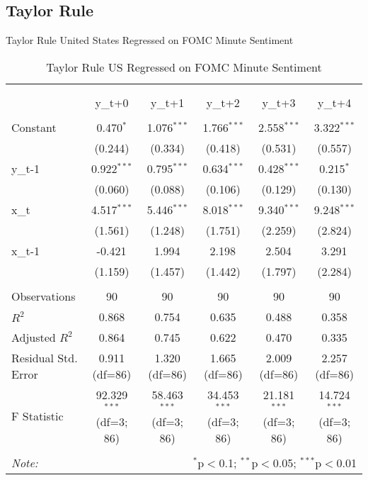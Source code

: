 \documentclass[12pt, letterpaper]{article}
\begin{document}
\subsection{Taylor Rule}

Taylor Rule United States Regressed on FOMC Minute Sentiment

\begin{table}[H] \centering
  \caption{Taylor Rule US Regressed on FOMC Minute Sentiment}
\begin{tabular}{@{\extracolsep{5pt}}lccccc}
\\[-1.8ex]\hline
\hline \\[-1.8ex]
\\[-1.8ex] & \multicolumn{1}{c}{y_{t+0}} & \multicolumn{1}{c}{y_{t+1}} & \multicolumn{1}{c}{y_{t+2}} & \multicolumn{1}{c}{y_{t+3}} & \multicolumn{1}{c}{y_{t+4}}  \\
\hline \\[-1.8ex]
 Constant & 0.470$^{*}$ & 1.076$^{***}$ & 1.766$^{***}$ & 2.558$^{***}$ & 3.322$^{***}$ \\
& (0.244) & (0.334) & (0.418) & (0.531) & (0.557) \\
 y_{t-1} & 0.922$^{***}$ & 0.795$^{***}$ & 0.634$^{***}$ & 0.428$^{***}$ & 0.215$^{*}$ \\
& (0.060) & (0.088) & (0.106) & (0.129) & (0.130) \\
 x_{t} & 4.517$^{***}$ & 5.446$^{***}$ & 8.018$^{***}$ & 9.340$^{***}$ & 9.248$^{***}$ \\
& (1.561) & (1.248) & (1.751) & (2.259) & (2.824) \\
 x_{t-1} & -0.421$^{}$ & 1.994$^{}$ & 2.198$^{}$ & 2.504$^{}$ & 3.291$^{}$ \\
& (1.159) & (1.457) & (1.442) & (1.797) & (2.284) \\
\hline \\[-1.8ex]
 Observations & 90 & 90 & 90 & 90 & 90 \\
 $R^2$ & 0.868 & 0.754 & 0.635 & 0.488 & 0.358 \\
 Adjusted $R^2$ & 0.864 & 0.745 & 0.622 & 0.470 & 0.335 \\
 Residual Std. Error & 0.911 (df=86) & 1.320 (df=86) & 1.665 (df=86) & 2.009 (df=86) & 2.257 (df=86) \\
 F Statistic & 92.329$^{***}$ (df=3; 86) & 58.463$^{***}$ (df=3; 86) & 34.453$^{***}$ (df=3; 86) & 21.181$^{***}$ (df=3; 86) & 14.724$^{***}$ (df=3; 86) \\
\hline
\hline \\[-1.8ex]
\textit{Note:} & \multicolumn{5}{r}{$^{*}$p$<$0.1; $^{**}$p$<$0.05; $^{***}$p$<$0.01} \\
\end{tabular}
\end{table}
\end{document}
